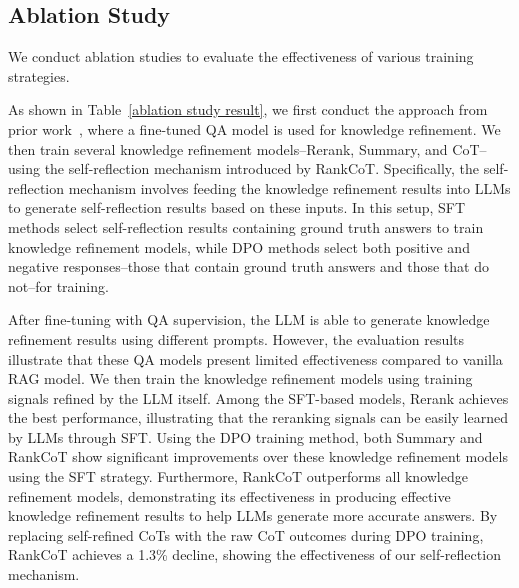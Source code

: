 \subsection{Ablation Study}
We conduct ablation studies to evaluate the effectiveness of various training strategies.

As shown in Table~\ref{ablation study result}, we first conduct the approach from prior work~\cite{lin2024radit}, where a fine-tuned QA model is used for knowledge refinement. We then train several knowledge refinement models--Rerank, Summary, and CoT--using the self-reflection mechanism introduced by RankCoT. Specifically, the self-reflection mechanism involves feeding the knowledge refinement results into LLMs to generate self-reflection results based on these inputs. In this setup, SFT methods select self-reflection results containing ground truth answers to train knowledge refinement models, while DPO methods select both positive and negative responses--those that contain ground truth answers and those that do not--for training.

After fine-tuning with QA supervision, the LLM is able to generate knowledge refinement results using different prompts. However, the evaluation results illustrate that these QA models present limited effectiveness compared to vanilla RAG model. We then train the knowledge refinement models using training signals refined by the LLM itself. Among the SFT-based models, Rerank achieves the best performance, illustrating that the reranking signals can be easily learned by LLMs through SFT. Using the DPO training method, both Summary and RankCoT show significant improvements over these knowledge refinement models using the SFT strategy. Furthermore, RankCoT outperforms all knowledge refinement models, demonstrating its effectiveness in producing effective knowledge refinement results to help LLMs generate more accurate answers. By replacing self-refined CoTs with the raw CoT outcomes during DPO training, RankCoT achieves a 1.3\% decline, showing the effectiveness of our self-reflection mechanism.



